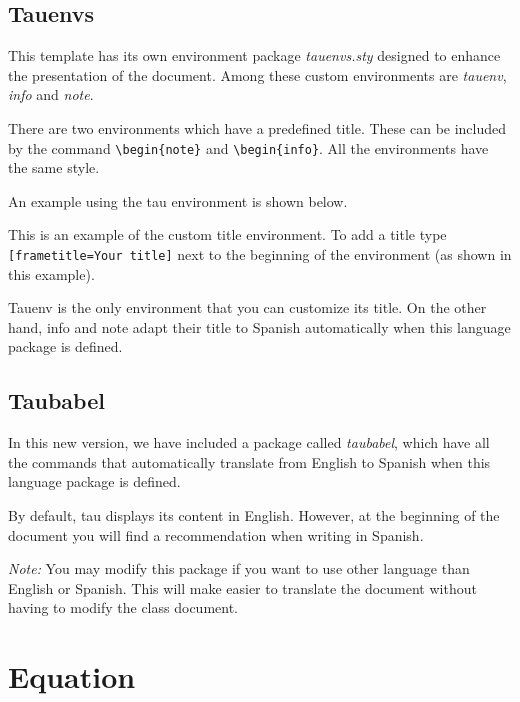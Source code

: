 \documentclass[9pt,a4paper,twoside]{tau-class/tau}
\begin{document}
    \subsection{Tauenvs}
	
        This template has its own environment package \textit{tauenvs.sty} designed to enhance the presentation of the document. Among these custom environments are \textit{tauenv}, \textit{info} and \textit{note}.
		
        There are two environments which have a predefined title. These can be included by the command \verb|\begin{note}| and \verb|\begin{info}|. All the environments have the same style.
			
        An example using the tau environment is shown below.
		
	\begin{tauenv}[frametitle=Environment with custom title]
            This is an example of the custom title environment. To add a title type \verb|[frametitle=Your title]| next to the beginning of the environment (as shown in this example).
	\end{tauenv}
		
        Tauenv is the only environment that you can customize its title. On the other hand, info and note adapt their title to Spanish automatically when this language package is defined.
		
    \subsection{Taubabel}

        In this new version, we have included a package called \textit{taubabel}, which have all the commands that automatically translate from English to Spanish when this language package is defined. 
        
        By default, tau displays its content in English. However, at the beginning of the document you will find a recommendation when writing in Spanish. 
		
        \textit{Note:} You may modify this package if you want to use other language than English or Spanish. This will make easier to translate the document without having to modify the class document.
		
\section{Equation}
\end{document}

